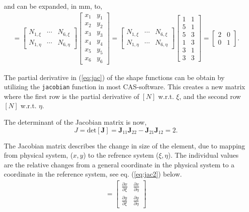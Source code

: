 \documentclass{article}
\begin{document}
\begin{enumerate}
	and can be expanded, in mm, to, 
\begin{align} 
	[\mathbf{J}] = 
	\begin{bmatrix}
		N_{1,\xi} & \cdots & N_{6,\xi} \\
		N_{1,\eta} & \cdots & N_{6,\eta} 
	\end{bmatrix}
	\begin{bmatrix}
		x_1 & y_1 \\
		x_2 & y_2 \\
		x_3 & y_3 \\
		x_4 & y_4 \\
		x_5 & y_5 \\
		x_6 & y_6 
	\end{bmatrix} = 
	\begin{bmatrix}
		N_{1,\xi} & \cdots & N_{6,\xi} \\
		N_{1,\eta} & \cdots & N_{6,\eta} 
	\end{bmatrix}
	\begin{bmatrix}
		1 & 1 \\
		5 & 1 \\
		5 & 3 \\
		1 & 3 \\
		3 & 1 \\
		3 & 3 
	\end{bmatrix} = 
	\begin{bmatrix}
		2 & 0 \\
		0 & 1
	\end{bmatrix}
	\label{eq:jac}
.\end{align} 

The partial derivative in (\ref{eq:jac}) of the shape functions can be obtain by utilizing the \texttt{jacobian} function in most CAS-software. This creates a new matrix where the first row is the partial derivative of $[N]$ w.r.t. $\xi$, and the second row $[N]$ w.r.t. $\eta$. 

The determinant of the Jacobian matrix is now, 
\[
	J = \text{det}[\mathbf{J}] = \mathbf{J}_{11}\mathbf{J}_{22}-\mathbf{J}_{21}\mathbf{J}_{12} = 2
.\]

The Jacobian matrix describes the change in size of the element, due to mapping from physical system, ($x, y$) to the refrence system ($\xi, \eta$).  The individual values are the relative changes from a general coordinate in the physical system to a coordinate in the reference system, see eq. (\ref{eq:jac2}) below. 
\begin{align}
	[\mathbf{J}] = 
\begin{bmatrix}
	\frac{\partial x}{\partial \xi} & \frac{\partial x}{\partial \eta} \\
	\frac{\partial y}{\partial \xi} & \frac{\partial y}{\partial \eta} 
\end{bmatrix}
\label{eq:jac2}
\end{align}


\end{enumerate}
\end{document}
